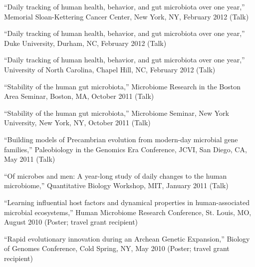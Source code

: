 \documentclass[overlapped,line,11pt]{res}
\begin{document}
\begin{resume}
\begin{revnumerate}[19]
\item {``Daily tracking of human health, behavior, and gut microbiota
  over one year,'' Memorial Sloan-Kettering Cancer Center, New York, NY,
  February 2012 (Talk)}
\vspace*{1mm}

\item {``Daily tracking of human health, behavior, and gut microbiota
  over one year,'' Duke University, Durham, NC, February 2012 (Talk)}
\vspace*{1mm}

\item {``Daily tracking of human health, behavior, and gut microbiota
  over one year,'' University of North Carolina, Chapel Hill, NC, February 2012 (Talk)}
\vspace*{1mm}

\item {``Stability of the human gut microbiota,'' Microbiome Research
  in the Boston Area Seminar, Boston, MA, October 2011 (Talk)}
\vspace*{1mm}

\item {``Stability of the human gut microbiota,'' Microbiome Seminar,
  New York University, New York, NY, October 2011 (Talk)}
\vspace*{1mm}

\item {``Building models of Precambrian evolution from modern-day
  microbial gene families,'' Paleobiology in the Genomics Era
  Conference, JCVI, San Diego, CA, May 2011 (Talk)}
\vspace*{1mm}

\item {``Of microbes and men:
A year-long study of daily changes to the human microbiome,''
Quantitative Biology Workshop, MIT, January 2011 (Talk)}
\vspace*{1mm}

\item {``Learning influential host factors and dynamical properties in
human-associated microbial ecosystems,'' Human Microbiome Research
Conference, St. Louis, MO, August 2010 (Poster; travel grant recipient)}
\vspace*{1mm}

\item {``Rapid evolutionary innovation during an Archean Genetic
  Expansion,'' Biology of Genomes Conference, Cold Spring, NY,
  May 2010 (Poster; travel grant recipient)}
\vspace*{1mm}



\end{revnumerate}
\end{resume}
\end{document}
